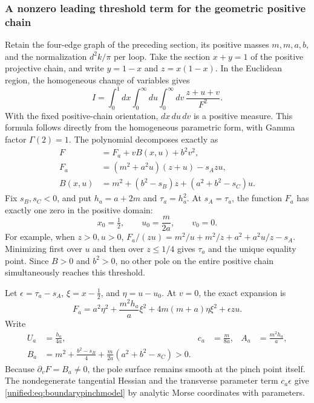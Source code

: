 \documentclass[11pt,a4paper,oneside]{article}
\theoremstyle{plain}
\theoremstyle{definition}
\theoremstyle{remark}
\numberwithin{equation}{section}
\begin{document}
\subsubsection{A nonzero leading threshold term for the geometric positive chain}
Retain the four-edge graph of the preceding section, its positive masses $m,m,a,b$, and the normalization $d^2k/\pi$ per loop.
Take the section $x+y=1$ of the positive projective chain, and write $y=1-x$ and $z=x(1-x)$.
In the Euclidean region, the homogeneous change of variables gives
\begin{equation}\label{unified:eq:scalaricechart}
 I=\int_0^1dx\int_0^\infty du\int_0^\infty dv\,
       \frac{z+u+v}{F^2}.
\end{equation}
With the fixed positive-chain orientation, $dx\,du\,dv$ is a positive measure.
This formula follows directly from the homogeneous parametric form, with Gamma factor $\Gamma(2)=1$.
The polynomial decomposes exactly as
\begin{align}
 F&=F_a+vB(x,u)+b^2v^2,\label{unified:eq:scalariceexpand}\\
 F_a&=(m^2+a^2u)(z+u)-s_Azu,\nonumber\\
 B(x,u)&=m^2+(b^2-s_B)z+(a^2+b^2-s_C)u.\nonumber
\end{align}
Fix $s_B,s_C<0$, and put $h_a=a+2m$ and $\tau_a=h_a^2$.
At $s_A=\tau_a$, the function $F_a$ has exactly one zero in the positive domain:
\[
 x_0=\tfrac12,\qquad u_0=\frac{m}{2a},\qquad v_0=0.
\]
For example, when $z>0,u>0$,
$F_a/(zu)=m^2/u+m^2/z+a^2+a^2u/z-s_A$.
Minimizing first over $u$ and then over $z\leq1/4$ gives $\tau_a$ and the unique equality point.
Since $B>0$ and $b^2>0$, no other pole on the entire positive chain simultaneously reaches this threshold.

Let $\epsilon=\tau_a-s_A$, $\xi=x-\tfrac12$, and $\eta=u-u_0$.
At $v=0$, the exact expansion is
\begin{equation}\label{unified:eq:scalaricehessian}
 F_a=a^2\eta^2+\frac{m^2h_a}{a}\xi^2
       +4m(m+a)\eta\xi^2+\epsilon zu.
\end{equation}
Write
\begin{align}
 U_a&=\frac{h_a}{4a},&
 c_a&=\frac{m}{8a},&
 A_a&=\frac{m^2h_a}{a},\nonumber\\
 B_a&=m^2+\frac{b^2-s_B}{4}
             +\frac{m}{2a}(a^2+b^2-s_C)>0.\label{unified:eq:scalariceconstants}
\end{align}
Because $\partial_vF=B_a\ne0$, the pole surface remains smooth at the pinch point itself.
The nondegenerate tangential Hessian and the transverse parameter term $c_a\epsilon$
give \eqref{unified:eq:boundarypinchmodel} by analytic Morse coordinates with parameters.
\end{document}
